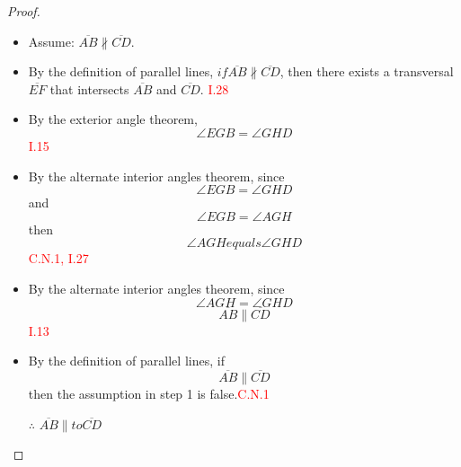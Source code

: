 \begin{proof}

\begin{itemize}

\item[]

    \item Assume: $\overline{AB} \nparallel \overline{CD}$.
    
    \item By the definition of parallel lines,  $if \overline{AB} \nparallel \overline{CD}$, then there exists a transversal $\overline{EF}$ that intersects $\overline{AB}$ and $\overline{CD}$. \hfill\textcolor{red}{ I.28}
    
\begin{figure}[H]
   	\caption{}
\end{figure}  
    
    \item By the exterior angle theorem,  
    \[\angle{EGB} = \angle{GHD}\]\hfill\textcolor{red}{ I.15}
    
        \clearpage
    
    \item By the alternate interior angles theorem, since 
    \[\angle{EGB} = \angle{GHD}\] 
    and 
    \[\angle{EGB} = \angle{AGH}\] 
    then 
    \[\angle{AGH} equals \angle{GHD}\] \hfill\textcolor{red}{ C.N.1, I.27}
    
    \item By the alternate interior angles theorem, since 
    \[\angle{AGH} = \angle{GHD}\] 
    \[\overline{AB} \parallel \overline{CD}\]\hfill\textcolor{red}{I.13}
    
    \item By the definition of parallel lines, if 
   \[ \overline{AB} \parallel \overline{CD}\] 
    then the assumption in step 1 is false.\hfill\textcolor{red}{C.N.1}
    
    \item[$\therefore$] $\overline{AB} \parallel to \overline{CD}$
    

\end{itemize}
\end{proof}

